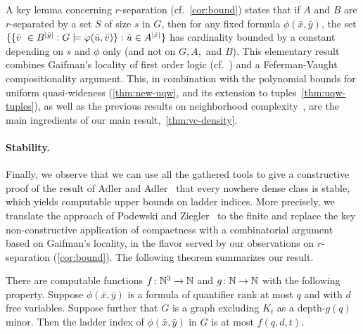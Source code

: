 A key lemma concerning $r$-separation (cf.~\cref{cor:bound}) states that if $A$
and $B$ are $r$-separated by a set $S$ of size $s$ in $G$,
then for any fixed formula $\phi(\bar x,\bar y)$,
the set  $\{\{\bar{v}\ \in B^{|\bar y|} : G\models\varphi(\bar{u},\bar{v})\} : \bar{u}\in A^{|\bar x|}\}$ has cardinality bounded by a constant depending on $s$ and $\phi$ only (and not on $G,A,$ and $B$). 
This elementary result combines Gaifman's locality of first order logic (cf.~\cite{gaifman1982local}) and a Feferman-Vaught compositionality argument. This, in combination with the polynomial bounds 
for uniform quasi-wideness (\cref{thm:new-uqw}, and its extension to tuples~\cref{thm:uqw-tuples}), 
as well as the previous results on neighborhood complexity~\cite{drange2016kernelization,eickmeyer2016neighborhood}, are the main ingredients of our main result,~\cref{thm:vc-density}.

\paragraph{Stability.}
Finally, we observe that we can use all the gathered tools to give a constructive proof of the result of Adler and Adler~\cite{adler2014interpreting}
that every nowhere dense class is stable, which yields computable upper bounds on ladder indices.
More precisely, we translate the approach of Podewski and Ziegler~\cite{podewski1978stable} to the finite
and replace the key non-constructive application of compactness with a combinatorial argument based on Gaifman's locality,
in the flavor served by our observations on $r$-separation (\cref{cor:bound}).
The following theorem summarizes our result.

\setcounter{stable}{\thetheorem}
\begin{theorem}\label{thm:new-stable}
There are computable functions $f\colon \mathbb{N}^3\to\mathbb{N}$ and $g\colon\mathbb{N}\to\mathbb{N}$ with the following property.
Suppose $\phi(\bar x,\bar y)$ is a formula of quantifier rank at most $q$ and with $d$ free variables.
Suppose further that $G$ is a graph excluding $K_t$ as a depth-$g(q)$ minor. Then the ladder index of $\phi(\bar x,\bar y)$ in $G$ is at most $f(q,d,t)$.
\end{theorem}


